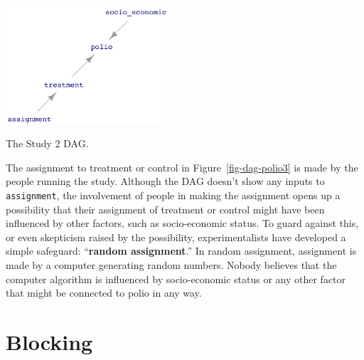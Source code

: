 \documentclass[
  letterpaper,
  DIV=11,
  numbers=noendperiod,
  oneside]{scrreprt}
\begin{document}
{\begin{footnotesize}
\begin{marginfigure}

{\centering \includegraphics[width=2.36in,height=\textheight]{./www/DAG-consent3.png}

}

\caption{\label{fig-dag-polio3}The Study 2 DAG.}

\end{marginfigure}

The assignment to treatment or control in Figure~\ref{fig-dag-polio3} is
made by the people running the study. Although the DAG doesn't show any
inputs to \texttt{assignment}, the involvement of people in making the
assignment opens up a possibility that their assignment of treatment or
control might have been influenced by other factors, such as
socio-economic status. To guard against this, or even skepticism raised
by the possibility, experimentalists have developed a simple safeguard:
``\textbf{random assignment}.'' In random assignment, assignment is made
by a computer generating random numbers. Nobody believes that the
computer algorithm is influenced by socio-economic status or any other
factor that might be connected to polio in any way.

\begin{tcolorbox}[enhanced jigsaw, colbacktitle=quarto-callout-warning-color!10!white, breakable, opacitybacktitle=0.6, colback=white, left=2mm, arc=.35mm, colframe=quarto-callout-warning-color-frame, coltitle=black, toprule=.15mm, opacityback=0, leftrule=.75mm, bottomtitle=1mm, toptitle=1mm, titlerule=0mm, title=\textcolor{quarto-callout-warning-color}{\faExclamationTriangle}\hspace{0.5em}{Under construction}, rightrule=.15mm, bottomrule=.15mm]

\end{tcolorbox}

\hypertarget{blocking}{%
\section{Blocking}\label{blocking}}


\end{footnotesize}}
\end{document}
